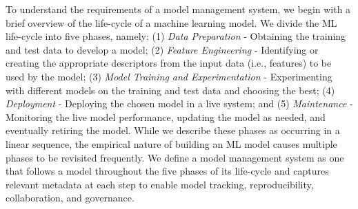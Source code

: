 \documentclass[11pt]{article}
\newcommand{\mpv}[1]{\textcolor{blue}{mpv: #1}}
\newcommand{\dss}{data scientists\xspace}
\begin{document}
To understand the requirements of a model management system, we begin with a brief overview of the life-cycle of a machine learning model.
We divide the ML life-cycle into five phases, namely:
(1) {\em Data Preparation} - Obtaining the training and test data to develop a model; 
(2) {\em Feature Engineering} - Identifying or creating the appropriate descriptors from the input data (i.e., features) to be used by the model; 
(3) {\em Model Training and Experimentation} - Experimenting with different models on the training and test data and choosing the best; 
(4) {\em Deployment} - Deploying the chosen model in a live system; and
(5) {\em Maintenance} - Monitoring the live model performance, updating the model as needed, and eventually retiring the model.
While we describe these phases as occurring in a linear sequence, the empirical nature of building an ML model causes multiple phases to be revisited frequently.
We define a model management system as one that follows a model throughout the five phases of its life-cycle and captures relevant metadata at each step to enable model tracking, reproducibility, collaboration, and governance.

\end{document}
